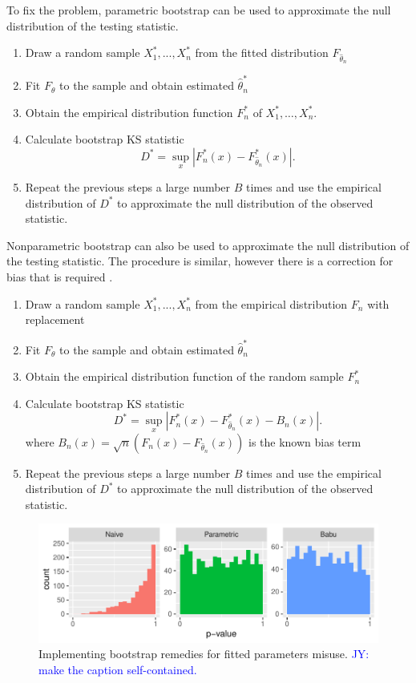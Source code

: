 \documentclass[12pt, letterpaper, titlepage]{article}
\newcommand{\jy}[1]{\textcolor{blue}{JY: #1}}
\begin{document}
To fix the problem, parametric bootstrap can be used to approximate the null
distribution of the testing statistic. 
\begin{enumerate}
  \item 
    Draw a random sample $X_1^*,...,X_n^*$ from the fitted distribution $F_{\hat\theta_n}$
  \item 
    Fit $F_\theta$ to the sample and obtain estimated $\hat\theta_n^*$
  \item
    Obtain the empirical distribution function $F_n^*$ of $X_1^*, \ldots, X_n^*$.
  \item 
    Calculate bootstrap KS statistic
    \[
      D^* = \sup_x | F_n^* (x)- F_{\hat\theta_n}^*(x) |.
    \]
  \item
    Repeat the previous steps a large number $B$ times and use the empirical 
    distribution of $D^*$ to approximate the null distribution of the observed 
    statistic.    
\end{enumerate}


Nonparametric bootstrap can also be used to approximate the null distribution 
of the testing statistic. The procedure is similar, however there is a 
correction for bias that is required \citep{Babu}.
\begin{enumerate}
  \item 
    Draw a random sample $X_1^*,...,X_n^*$ from the empirical distribution $F_n$
    with replacement
  \item 
    Fit $F_\theta$ to the sample and obtain estimated $\hat\theta_n^*$
  \item
    Obtain the empirical distribution function of the random sample $F_n^*$
  \item 
    Calculate bootstrap KS statistic
    \[
      D^* = \sup_x | F_n^* (x)- F_{\hat\theta_n}^*(x) - B_n(x) |.
    \]
    where $B_{n}(x) = \sqrt{n}(F_{n}(x) - F_{\hat\theta_n}(x))$ is the known bias
    term \citep{Babu}
  \item
    Repeat the previous steps a large number $B$ times and use the empirical 
    distribution of $D^*$ to approximate the null distribution of the observed 
    statistic.
\end{enumerate}


\begin{figure}[tbp]
  \centering
  \includegraphics[width=\textwidth]{hist_fitted}
  \caption{Implementing bootstrap remedies for fitted parameters misuse. \jy{make the caption self-contained.}}
  \label{fig:hist_fitted}
\end{figure}
\end{document}
